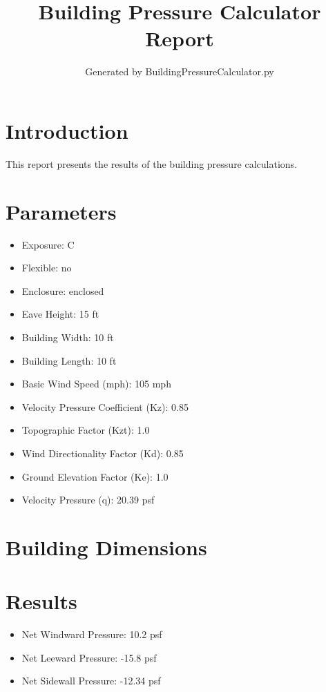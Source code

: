 \documentclass{article}
\title{Building Pressure Calculator Report}
\author{Generated by BuildingPressureCalculator.py}
\begin{document}
\maketitle

\section{Introduction}
This report presents the results of the building pressure calculations.

\section{Parameters}
\begin{itemize}
    \item Exposure: C
    \item Flexible: no
    \item Enclosure: enclosed
    \item Eave Height: 15 ft
    \item Building Width: 10 ft
    \item Building Length: 10 ft
    \item Basic Wind Speed (mph): 105 mph
    \item Velocity Pressure Coefficient (Kz): 0.85
    \item Topographic Factor (Kzt): 1.0
    \item Wind Directionality Factor (Kd): 0.85
    \item Ground Elevation Factor (Ke): 1.0
    \item Velocity Pressure (q): 20.39 psf
\end{itemize}

\section{Building Dimensions}

\section{Results}
\begin{itemize}
    \item Net Windward Pressure: 10.2 psf
    \item Net Leeward Pressure: -15.8 psf
    \item Net Sidewall Pressure: -12.34 psf
\end{itemize}
\end{document}
